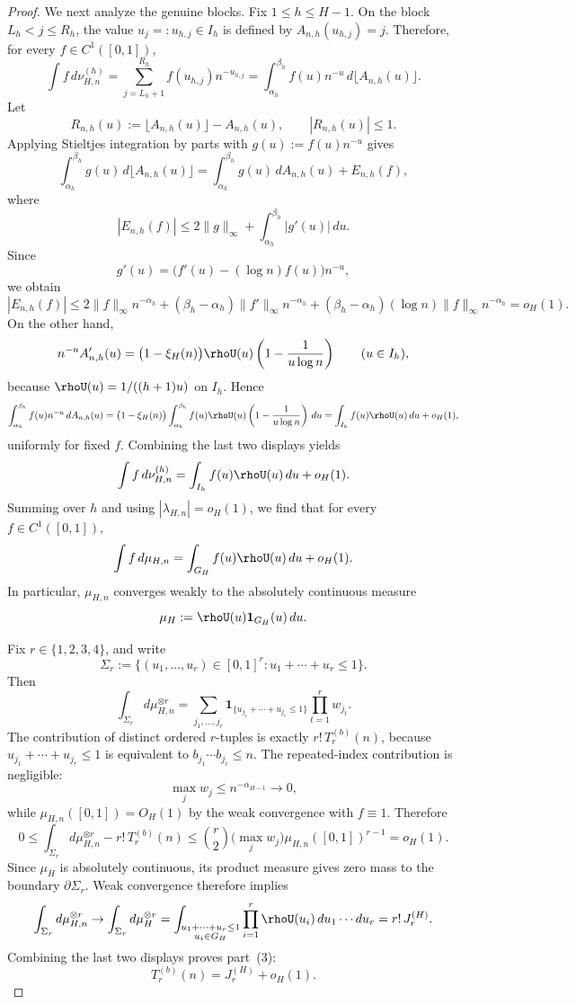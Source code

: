 \begin{proof}
We next analyze the genuine blocks.  Fix $1\le h\le H-1$.  On the block
$L_h<j\le R_h$, the value $u_j=:u_{h,j}\in I_h$ is defined by
$A_{n,h}(u_{h,j})=j$.  Therefore, for every $f\in C^1([0,1])$,
\[
  \int f\,d\nu_{H,n}^{(h)}
  =
  \sum_{j=L_h+1}^{R_h} f(u_{h,j})n^{-u_{h,j}}
  =
  \int_{\alpha_h}^{\beta_h} f(u)n^{-u}\,d\lfloor A_{n,h}(u)\rfloor.
\]
Let
\[
  R_{n,h}(u):=\lfloor A_{n,h}(u)\rfloor-A_{n,h}(u),
  \qquad |R_{n,h}(u)|\le 1.
\]
Applying Stieltjes integration by parts with
$g(u):=f(u)n^{-u}$ gives
\[
  \int_{\alpha_h}^{\beta_h} g(u)\,d\lfloor A_{n,h}(u)\rfloor
  =
  \int_{\alpha_h}^{\beta_h} g(u)\,dA_{n,h}(u)
  +
  E_{n,h}(f),
\]
where
\[
  |E_{n,h}(f)|
  \le
  2\|g\|_\infty+\int_{\alpha_h}^{\beta_h}|g'(u)|\,du.
\]
Since
\[
  g'(u)=\bigl(f'(u)-(\log n)f(u)\bigr)n^{-u},
\]
we obtain
\[
  |E_{n,h}(f)|
  \le
  2\|f\|_\infty n^{-\alpha_h}
  +(\beta_h-\alpha_h)\|f'\|_\infty n^{-\alpha_h}
  +(\beta_h-\alpha_h)(\log n)\|f\|_\infty n^{-\alpha_h}
  =
  o_H(1).
\]
On the other hand,
\[
  n^{-u}A_{n,h}'(u)
  =
  \bigl(1-\xi_H(n)\bigr)\rhoU(u)
  \left(1-\frac{1}{u\log n}\right)
  \qquad (u\in I_h),
\]
because $\rhoU(u)=1/((h+1)u)$ on $I_h$.  Hence
\[
  \int_{\alpha_h}^{\beta_h} f(u)n^{-u}\,dA_{n,h}(u)
  =
  \bigl(1-\xi_H(n)\bigr)\int_{\alpha_h}^{\beta_h}
  f(u)\rhoU(u)\left(1-\frac{1}{u\log n}\right)\,du
  =
  \int_{I_h} f(u)\rhoU(u)\,du+o_H(1),
\]
uniformly for fixed $f$.  Combining the last two displays yields
\[
  \int f\,d\nu_{H,n}^{(h)}
  =
  \int_{I_h} f(u)\rhoU(u)\,du+o_H(1).
\]
Summing over $h$ and using $|\lambda_{H,n}|=o_H(1)$, we find that for every
$f\in C^1([0,1])$,
\[
  \int f\,d\mu_{H,n}
  =
  \int_{G_H} f(u)\rhoU(u)\,du+o_H(1).
\]
In particular, $\mu_{H,n}$ converges weakly to the absolutely continuous
measure
\[
  \mu_H:=\rhoU(u)\mathbf 1_{G_H}(u)\,du.
\]

Fix $r\in\{1,2,3,4\}$, and write
\[
  \Sigma_r:=\{(u_1,\dots,u_r)\in[0,1]^r:u_1+\cdots+u_r\le 1\}.
\]
Then
\[
  \int_{\Sigma_r} d\mu_{H,n}^{\otimes r}
  =
  \sum_{j_1,\dots,j_r}
  \mathbf 1_{\{u_{j_1}+\cdots+u_{j_r}\le 1\}}
  \prod_{t=1}^r w_{j_t}.
\]
The contribution of distinct ordered $r$-tuples is exactly
$r!\,T_r^{(b)}(n)$, because
$u_{j_1}+\cdots+u_{j_r}\le 1$ is equivalent to
$b_{j_1}\cdots b_{j_r}\le n$.  The repeated-index contribution is negligible:
\[
  \max_j w_j \le n^{-\alpha_{H-1}} \to 0,
\]
while $\mu_{H,n}([0,1])=O_H(1)$ by the weak convergence with $f\equiv 1$.
Therefore
\[
  0
  \le
  \int_{\Sigma_r} d\mu_{H,n}^{\otimes r}-r!\,T_r^{(b)}(n)
  \le
  \binom{r}{2}\bigl(\max_j w_j\bigr)\mu_{H,n}([0,1])^{r-1}
  =
  o_H(1).
\]
Since $\mu_H$ is absolutely continuous, its product measure gives zero mass to
the boundary $\partial\Sigma_r$.  Weak convergence therefore implies
\[
  \int_{\Sigma_r} d\mu_{H,n}^{\otimes r}
  \to
  \int_{\Sigma_r} d\mu_H^{\otimes r}
  =
  \int_{\substack{u_1+\cdots+u_r\le 1\\u_i\in G_H}}
  \prod_{i=1}^r \rhoU(u_i)\,du_1\cdots du_r
  =
  r!\,J_r^{(H)}.
\]
Combining the last two displays proves part~(3):
\[
  T_r^{(b)}(n)=J_r^{(H)}+o_H(1).
\]


\end{proof}
